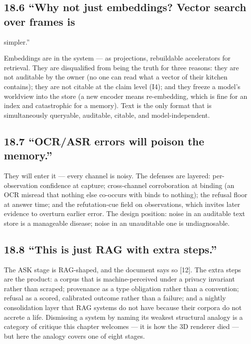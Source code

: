 \subsection{18.6 ``Why not just embeddings? Vector search over frames is}\label{why-not-just-embeddings-vector-search-over-frames-is}

simpler.''

Embeddings are in the system --- as projections, rebuildable accelerators for retrieval. They are disqualified from being the truth for three reasons: they are not auditable by the owner (no one can read what a vector of their kitchen contains); they are not citable at the claim level (I4); and they freeze a model's worldview into the store (a new encoder means re-embedding, which is fine for an index and catastrophic for a memory). Text is the only format that is simultaneously queryable, auditable, citable, and model-independent.

\subsection{18.7 ``OCR/ASR errors will poison the memory.''}\label{ocrasr-errors-will-poison-the-memory.}

They will enter it --- every channel is noisy. The defenses are layered: per-observation confidence at capture; cross-channel corroboration at binding (an OCR misread that nothing else co-occurs with binds to nothing); the refusal floor at answer time; and the refutation-cue field on observations, which invites later evidence to overturn earlier error. The design position: noise in an auditable text store is a manageable disease; noise in an unauditable one is undiagnosable.

\subsection{18.8 ``This is just RAG with extra steps.''}\label{this-is-just-rag-with-extra-steps.}

The ASK stage is RAG-shaped, and the document says so {[}12{]}. The extra steps are the product: a corpus that is machine-perceived under a privacy invariant rather than scraped; provenance as a type obligation rather than a convention; refusal as a scored, calibrated outcome rather than a failure; and a nightly consolidation layer that RAG systems do not have because their corpora do not accrete a life. Dismissing a system by naming its weakest structural analogy is a category of critique this chapter welcomes --- it is how the 3D renderer died --- but here the analogy covers one of eight stages.

